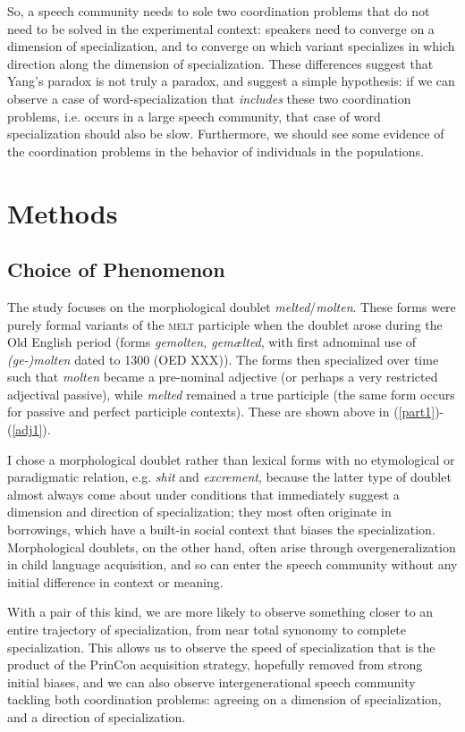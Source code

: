 \documentclass{artikel3}
\begin{document}
So, a speech community needs to sole two coordination problems that do not need to be solved in the experimental context: speakers need to converge on a dimension of specialization, and to converge on which variant specializes in which direction along the dimension of specialization. These differences suggest that Yang's paradox is not truly a paradox, and suggest a simple hypothesis: if we can observe a case of word-specialization that \textsl{includes} these two coordination problems, i.e. occurs in a large speech community, that case of word specialization should also be slow. Furthermore, we should see some evidence of the coordination problems in the behavior of individuals in the populations. 



\section{Methods}
\label{methods}

\subsection{Choice of Phenomenon}

The study focuses on the morphological doublet \textsl{melted}/\textsl{molten}. These forms were purely formal variants of the \textsc{melt} participle when the doublet arose during the Old English period (forms \textsl{gemolten, gemælted}, with first adnominal use of \textsl{(ge-)molten} dated to 1300 (OED XXX)). The forms then specialized over time such that \textsl{molten} became a pre-nominal adjective (or perhaps a very restricted adjectival passive), while \textsl{melted} remained a true participle (the same form occurs for passive and perfect participle contexts). These are shown above in (\ref{part1})-(\ref{adj1}). 

I chose a morphological doublet rather than lexical forms with no etymological or paradigmatic relation, e.g. \textsl{shit} and \textsl{excrement}, because the latter type of doublet almost always come about under conditions that immediately suggest a dimension and direction of specialization; they most often originate in borrowings, which have a built-in social context that biases the specialization. Morphological doublets, on the other hand, often arise through overgeneralization in child language acquisition, and so can enter the speech community without any initial difference in context or meaning.

With a pair of this kind, we are more likely to observe something closer to an entire trajectory of specialization, from near total synonomy to complete specialization. This allows us to observe the speed of specialization that is the product of the PrinCon acquisition strategy, hopefully removed from strong initial biases, and we can also observe intergenerational speech community tackling both coordination problems: agreeing on a dimension of specialization, and a direction of specialization.
\end{document}
